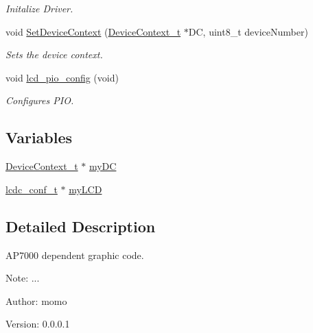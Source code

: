 \begin{CompactItemize}
\begin{CompactList}\small\item\em Initalize Driver. \item\end{CompactList}\item 
void \hyperlink{group__ap7000__lcd_gf5e9e0c22e0b24937dd062a816e80cfc}{SetDeviceContext} (\hyperlink{struct_device_context__t}{DeviceContext\_\-t} $\ast$DC, uint8\_\-t deviceNumber)
\begin{CompactList}\small\item\em Sets the device context. \item\end{CompactList}\item 
\hypertarget{group__ap7000__lcd_g56383c24c79cdc986208c6cd3dacc081}{
void \hyperlink{group__ap7000__lcd_g56383c24c79cdc986208c6cd3dacc081}{lcd\_\-pio\_\-config} (void)}
\label{group__ap7000__lcd_g56383c24c79cdc986208c6cd3dacc081}

\begin{CompactList}\small\item\em Configures PIO. \item\end{CompactList}\end{CompactItemize}
\subsection*{Variables}
\begin{CompactItemize}
\item 
\hyperlink{struct_device_context__t}{DeviceContext\_\-t} $\ast$ \hyperlink{group__ap7000__lcd_gba0cd39ac57537de654bae9fd5bab786}{myDC}
\item 
\hyperlink{structlcdc__configuration__s}{lcdc\_\-conf\_\-t} $\ast$ \hyperlink{group__ap7000__lcd_ga3707e3377bafcb6d796ce38a46273c5}{myLCD}
\end{CompactItemize}


\subsection{Detailed Description}
AP7000 dependent graphic code. 

\begin{Desc}
\item[Note:]... \end{Desc}
\begin{Desc}
\item[Author:]momo \end{Desc}
\begin{Desc}
\item[Version:]0.0.0.1 \end{Desc}


